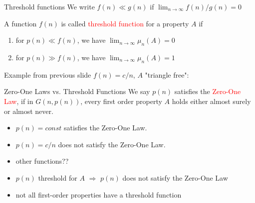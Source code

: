 \documentclass[handout]{beamer}
\renewcommand{\emph}[1]{\textcolor{red}{#1}}
\begin{document}
\begin{frame}{Threshold functions}
  We write $f(n)\ll g(n)$ if $\lim_{n\rightarrow\infty} f(n)/g(n)=0$
  
\pause
\bigskip
  A function $f(n)$ is called \emph{threshold function} for a property $A$ if
  \begin{enumerate}
    \item for $p(n)\ll f(n)$, we have $\lim_{n\rightarrow\infty}\mu_n(A)=0$
    \item for $p(n)\gg f(n)$, we have $\lim_{n\rightarrow\infty}\mu_n(A)=1$
  \end{enumerate}

  \pause
  Example from previous slide $f(n)=c/n$, $A$ "triangle free": 

\end{frame}



\begin{frame}{Zero-One Laws \mbox{vs.} Threshold Functions}
  We say $p(n)$ satisfies the \emph{Zero-One Law}, if in $G(n,p(n))$, every
first order property $A$ holds either almost surely or almost never. 

\pause
\begin{itemize}
  \item $p(n)=const$ satisfies the Zero-One Law.
  \item $p(n)=c/n$ does not satisfy the Zero-One Law.
  \pause
  \item other functions??
		\pause
	\item $p(n)$ threshold for $A$ $\Rightarrow$ $p(n)$ does not satisfy the Zero-One Law 
		\pause
	\item not all first-order properties have a threshold function 
\end{itemize}

% 
\end{frame}
\end{document}
